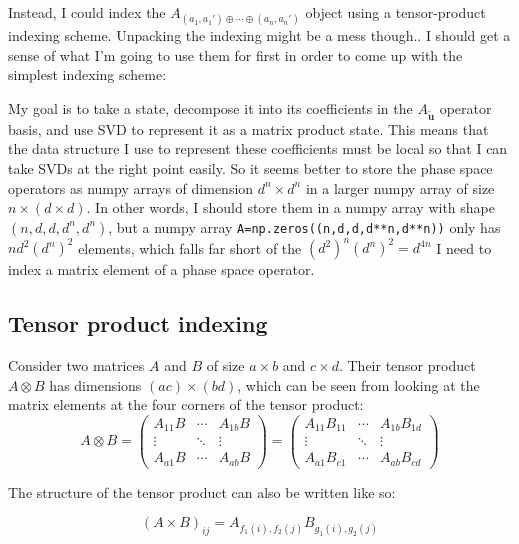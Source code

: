 \documentclass{report}
\begin{document}
Instead, I could index the $A_{(a_1,a_1')\oplus \cdots \oplus (a_n,a_n')}$ object using a tensor-product indexing scheme. Unpacking the indexing might be a mess though.. I should get a sense of what I'm going to use them for first in order to come up with the simplest indexing scheme:

My goal is to take a state, decompose it into its coefficients in the $A_{\tilde{\bm u}}$ operator basis, and use SVD to represent it as a matrix product state. This means that the data structure I use to represent these coefficients must be local so that I can take SVDs at the right point easily. So it seems better to store the phase space operators as numpy arrays of dimension $d^n\times d^n$ in a larger numpy array of size $n\times (d\times d)$. In other words, I should store them in a numpy array with shape $(n,d,d,d^n,d^n)$, but a numpy array \lstinline{A=np.zeros((n,d,d,d**n,d**n))} only has $nd^2(d^n)^2$ elements, which falls far short of the $(d^2)^n(d^n)^2=d^{4n}$ I need to index a matrix element of a phase space operator. 

\subsection{Tensor product indexing}

Consider two matrices $A$ and $B$ of size $a\times b$ and $c\times d$. Their tensor product $A\otimes B$ has dimensions $(ac)\times (bd)$, which can be seen from looking at the matrix elements at the four corners of the tensor product:
\begin{equation}
A\otimes B=
\begin{pmatrix}
A_{11}B&\cdots&A_{1b}B\\
 \vdots&\ddots&\vdots\\
 A_{a1}B&\cdots&A_{ab}B
 \end{pmatrix}
 =
 \begin{pmatrix}
A_{11}B_{11}&\cdots&A_{1b}B_{1d}\\
 \vdots&\ddots&\vdots\\
 A_{a1}B_{c1}&\cdots&A_{ab}B_{cd}
 \end{pmatrix}
 \end{equation}
 
 The structure of the tensor product can also be written like so:
 
 \begin{equation}(A\times B)_{ij}=A_{f_1(i),f_2(j)}B_{g_1(i),g_2(j)}\end{equation}
 
\end{document}

